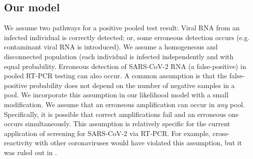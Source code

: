 \documentclass{article}
\begin{document}
\subsection{Our model}
We assume two pathways for a positive pooled test result: Viral RNA
from an infected individual is correctly detected; or, some erroneous
detection occurs (e.g. contaminant viral RNA is introduced). We assume
a homogeneous and disconnected population (each individual is infected
independently and with equal probability. Erroneous detection of
SARS-CoV-2 RNA (a false-positive) in pooled RT-PCR testing can also
occur. A common assumption \cite{Simplistic1, Simplistic2, Kim,
  OptimalDorfmanPool} is that the false-positive probability does not
depend on the number of negative samples in a pool. We incorporate
this assumption in our likelihood model with a small modification. We
assume that an erroneous amplification can occur in \emph{any}
pool. Specifically, it is possible that correct amplifications fail
and an erroneous one occurs simultaneously. This assumption is
relatively specific for the current application of screening for
SARS-CoV-2 via RT-PCR.  For example, cross-reactivity with other
coronaviruses would have violated this assumption, but it was ruled
out in \cite{KitComparison}.
\end{document}
